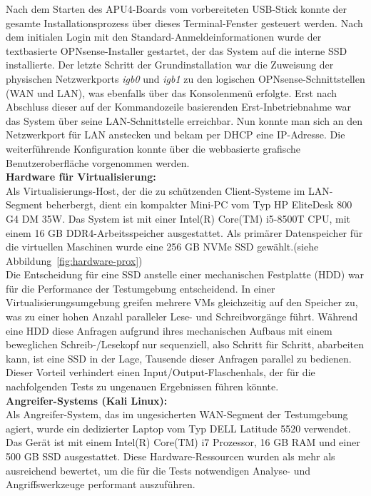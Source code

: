 Nach dem Starten des APU4-Boards vom vorbereiteten USB-Stick konnte der gesamte Installationsprozess über dieses Terminal-Fenster gesteuert werden. Nach dem initialen Login mit den Standard-Anmeldeinformationen wurde der textbasierte OPNsense-Installer gestartet, der das System auf die interne SSD installierte. Der letzte Schritt der Grundinstallation war die Zuweisung der physischen Netzwerkports \textit{igb0} und \textit{igb1} zu den logischen OPNsense-Schnittstellen (WAN und LAN), was ebenfalls über das Konsolenmenü erfolgte. Erst nach Abschluss dieser auf der Kommandozeile basierenden Erst-Inbetriebnahme war das System über seine LAN-Schnittstelle erreichbar.
Nun konnte man sich an den Netzwerkport für LAN anstecken und bekam per DHCP eine IP-Adresse. Die weiterführende Konfiguration konnte über die webbasierte grafische Benutzeroberfläche vorgenommen werden.\\

\textbf{Hardware für Virtualisierung:}\\
Als Virtualisierungs-Host, der die zu schützenden Client-Systeme im LAN-Segment beherbergt, dient ein kompakter Mini-PC vom Typ HP EliteDesk 800 G4 DM 35W. Das System ist mit einer Intel(R) Core(TM) i5-8500T CPU, mit einem 16 GB DDR4-Arbeitsspeicher ausgestattet. Als primärer Datenspeicher für die virtuellen Maschinen wurde eine 256 GB NVMe SSD gewählt.(siehe Abbildung~\ref{fig:hardware-prox})\\

Die Entscheidung für eine SSD anstelle einer mechanischen Festplatte (HDD) war für die Performance der Testumgebung entscheidend. In einer Virtualisierungsumgebung greifen mehrere VMs gleichzeitig auf den Speicher zu, was zu einer hohen Anzahl paralleler Lese- und Schreibvorgänge führt. Während eine HDD diese Anfragen aufgrund ihres mechanischen Aufbaus mit einem beweglichen Schreib-/Lesekopf nur sequenziell, also Schritt für Schritt, abarbeiten kann, ist eine SSD in der Lage, Tausende dieser Anfragen parallel zu bedienen. Dieser Vorteil verhindert einen Input/Output-Flaschenhals, der für die nachfolgenden Tests zu ungenauen Ergebnissen führen könnte.\\

\textbf{Angreifer-Systems (Kali Linux):}\\
Als Angreifer-System, das im ungesicherten WAN-Segment der Testumgebung agiert, wurde ein dedizierter Laptop vom Typ DELL Latitude 5520 verwendet. Das Gerät ist mit einem Intel(R) Core(TM) i7 Prozessor, 16 GB RAM und einer 500 GB SSD ausgestattet. Diese Hardware-Ressourcen wurden als mehr als ausreichend bewertet, um die für die Tests notwendigen Analyse- und Angriffswerkzeuge performant auszuführen.\\


